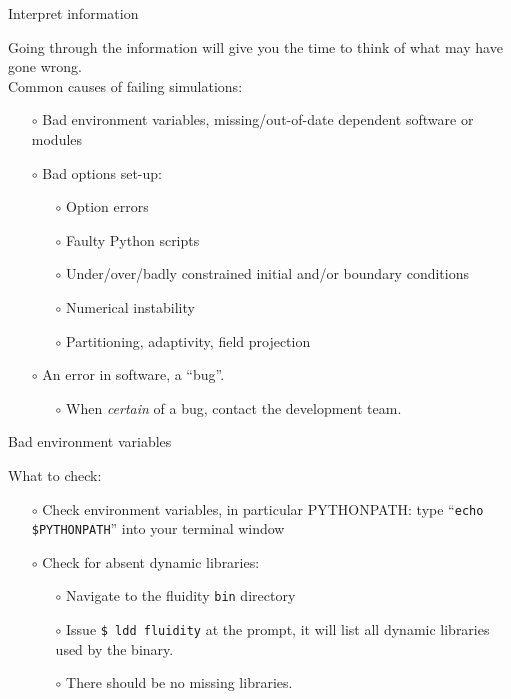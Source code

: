 \documentclass[t]{beamer}
\begin{document}

\begin{frame}{Interpret information}

Going through the information will give you the time to think of what may have gone wrong.\\
\vspace{10pt}
Common causes of failing simulations:
\vspace{10pt}
\begin{itemize}
 \item[$\circ$] Bad environment variables, missing/out-of-date dependent software or modules
 \item[$\circ$] Bad options set-up:
 \begin{itemize}
  \item[$\circ$] Option errors
  \item[$\circ$] Faulty Python scripts
  \item[$\circ$] Under/over/badly constrained initial and/or boundary conditions
  \item[$\circ$] Numerical instability
  \item[$\circ$] Partitioning, adaptivity, field projection
 \end{itemize}
 \item[$\circ$] An error in software, a ``bug''.
 \begin{itemize}
  \item[$\circ$] When \emph{certain} of a bug, contact the development team.
 \end{itemize}
\end{itemize}

\end{frame}


\begin{frame}{Bad environment variables}

What to check:

\begin{itemize}
 \item[$\circ$] Check environment variables, in particular PYTHONPATH: type ``{\tt echo \$PYTHONPATH}'' into your terminal window
 \item[$\circ$] Check for absent dynamic libraries:
 \begin{itemize}
  \item[$\circ$] Navigate to the fluidity \texttt{bin} directory 
  \item[$\circ$] Issue \texttt{\$ ldd fluidity} at the prompt, it will list all dynamic libraries used by the binary.
  \item[$\circ$] There should be no missing libraries.
 \end{itemize}
\end{itemize}
\end{frame}
\end{document}
